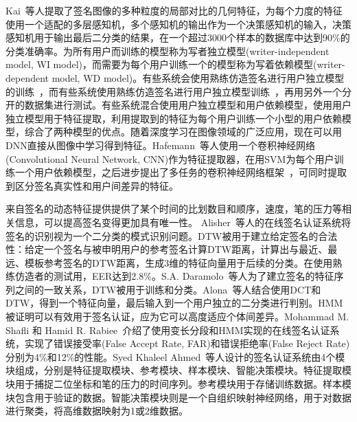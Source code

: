 Kai~\cite{huang1997off}等人提取了签名图像的多种粒度的局部对比的几何特征，为每个力度的特征使用一个适配的多层感知机，多个感知机的输出作为一个决策感知机的输入，决策感知机用于输出最后二分类的结果，在一个超过3000个样本的数据库中达到90\%的分类准确率。为所有用户而训练的模型称为写者独立模型(writer-independent model, WI model)，而需要为每个用户训练一个的模型称为写着依赖模型(writer-dependent model, WD model)。有些系统会使用熟练仿造签名进行用户独立模型的训练~\cite{rivard2013multi,eskander2013hybrid}，而有些系统使用熟练仿造签名进行用户独立模型训练~\cite{yilmaz2016score,rantzsch2016signature,hafemann2017learning}，再用另外一个分开的数据集进行测试。有些系统混合使用用户独立模型和用户依赖模型，使用用户独立模型用于特征提取，利用提取到的特征为每个用户训练一个小型的用户依赖模型，综合了两种模型的优点。随着深度学习在图像领域的广泛应用，现在可以用DNN直接从图像中学习得到特征。Hafemann~\cite{hafemann2016writer}等人使用一个卷积神经网络(Convolutional Neural Network, CNN)作为特征提取器，在用SVM为每个用户训练一个用户依赖模型，之后进步提出了多任务的卷积神经网络框架~\cite{hafemann2017learning}，可同时提取到区分签名真实性和用户间差异的特征。

来自签名的动态特征提供提供了某个时间的比划数目和顺序，速度，笔的压力等相关信息，可以提高签名变得更加具有唯一性。 Alisher~\cite{kholmatov2005identity}等人的在线签名认证系统将签名的识别视为一个二分类的模式识别问题。DTW被用于建立给定签名的合法性：给定一个签名与被申明用户的参考签名计算DTW距离，计算出与最近、最远、模板参考签名的DTW距离，生成3维的特征向量用于后续的分类。在使用熟练仿造者的测试用，EER达到2.8\%。S.A. Daramolo~\cite{daramola2010efficient}等人为了建立签名的特征序列之间的一致关系，DTW被用于训练和分类。Alona~\cite{levy2018handwritten}等人结合使用DCT和DTW，得到一个特征向量，最后输入到一个用户独立的二分类进行判别。HMM被证明可以有效用于签名认证，应为它可以高度适应个体间差异。Mohammad M. Shafli 和 Hamid R. Rabiee~\cite{shafiei2003new}介绍了使用变长分段和HMM实现的在线签名认证系统，实现了错误接受率(False Accept Rate, FAR)和错误拒绝率(False Reject Rate)分别为4\%和12\%的性能。Syed Khaleel Ahmed~\cite{ahmed2009automatic}等人设计的签名认证系统由4个模块组成，分别是特征提取模块、参考模块、样本模块、智能决策模块。特征提取模块用于捕捉二位坐标和笔的压力的时间序列。参考模块用于存储训练数据。样本模块包含用于验证的数据。智能决策模块则是一个自组织映射神经网络，用于对数据进行聚类，将高维数据映射为1或2维数据。%

